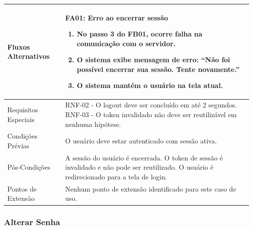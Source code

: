 \begin{longtable}{ >{\raggedright}p{2.8cm} | >{\raggedright\arraybackslash}p{10.7cm} }
Fluxos Alternativos & \mbox{}
\textbf{FA01:} Erro ao encerrar sessão
\vspace{2pt}
\begin{enumerate}[nosep,leftmargin=1.2em,topsep=0pt,partopsep=0pt,parsep=0pt,itemsep=0pt,after=\vspace{2pt}]
    \item No passo 3 do FB01, ocorre falha na comunicação com o servidor.
    \item O sistema exibe mensagem de erro: ``Não foi possível encerrar sua sessão. Tente novamente.''
    \item O sistema mantém o usuário na tela atual.
\end{enumerate}
\mbox{} \\ \hline

Requisitos Especiais & RNF-02 - O logout deve ser concluído em até 2 segundos. RNF-03 - O token invalidado não deve ser reutilizável em nenhuma hipótese. \\ \hline

Condições Prévias & O usuário deve estar autenticado com sessão ativa. \\ \hline

Pós-Condições & A sessão do usuário é encerrada. O token de sessão é invalidado e não pode ser reutilizado. O usuário é redirecionado para a tela de login. \\ \hline

Pontos de Extensão & Nenhum ponto de extensão identificado para este caso de uso. \\
\end{longtable}
\renewcommand{\arraystretch}{1}
\FloatBarrier


\subsubsection{Alterar Senha}

